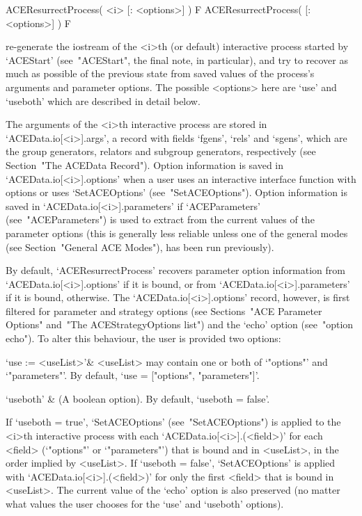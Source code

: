 \>ACEResurrectProcess( <i> [: <options>] ) F
\>ACEResurrectProcess( [: <options>] ) F

re-generate the {\GAP} iostream of the <i>th (or default)  interactive
{\ACE} process started by `ACEStart' (see~"ACEStart", the final  note,
in particular), and try to recover as much as possible of the previous
state from saved values  of  the  process's  arguments  and  parameter
options. The possible <options> here are `use' and `useboth' which are
described in detail below.

The arguments of the <i>th interactive {\ACE} process  are  stored  in
`ACEData.io[<i>].args', a  record  with  fields  `fgens',  `rels'  and
`sgens', which are the {\GAP} group generators, relators and  subgroup
generators, respectively (see Section~"The  ACEData  Record").  Option
information is saved in `ACEData.io[<i>].options' when a user uses  an
interactive  {\ACE}  interface   function   with   options   or   uses
`SetACEOptions' (see~"SetACEOptions"). Option information is saved  in
`ACEData.io[<i>].parameters' if `ACEParameters'  (see~"ACEParameters")
is used to extract from  {\ACE}  the  current  values  of  the  {\ACE}
parameter options (this is generally less reliable unless one  of  the
general {\ACE} modes (see Section~"General ACE Modes"), has  been  run
previously).

By   default,   `ACEResurrectProcess'   recovers   parameter    option
information from `ACEData.io[<i>].options' if it  is  bound,  or  from
`ACEData.io[<i>].parameters'  if   it   is   bound,   otherwise.   The
`ACEData.io[<i>].options'  record,  however,  is  first  filtered  for
parameter and strategy options (see Sections~"ACE  Parameter  Options"
and~"The ACEStrategyOptions list") and the `echo' option  (see~"option
echo"). To alter this behaviour, the user is provided two options:

\beginitems

\quad`use := <useList>'& <useList>  may   contain   one  or  both   of
`"options"'  and  `"parameters"'.  By  default,  `use  =   ["options",
"parameters"]'.

\quad`useboth' & (A boolean option). By default, `useboth = false'.

\enditems

If `useboth = true', `SetACEOptions' (see~"SetACEOptions") is  applied
to    the    <i>th    interactive    {\ACE}    process    with    each
`ACEData.io[<i>].(<field>)'   for   each   <field>   (`"options"'   or
`"parameters"') that is bound and in <useList>, in the  order  implied
by <useList>. If `useboth = false', `SetACEOptions'  is  applied  with
`ACEData.io[<i>].(<field>)' for only the first <field> that  is  bound
in <useList>. The current value of the `echo' option is also preserved
(no matter what values the user chooses for the  `use'  and  `useboth'
options).

